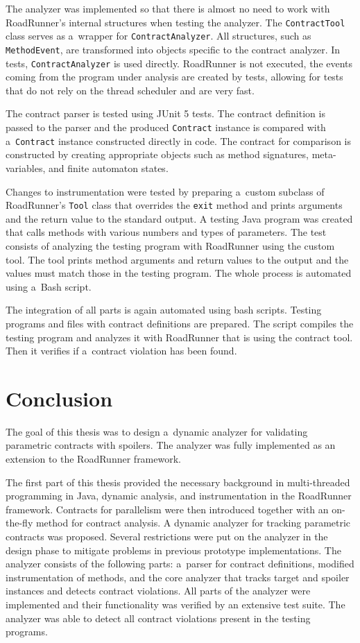 The analyzer was implemented so that there is almost no need to work with
RoadRunner's internal structures when testing the analyzer. The
\texttt{ContractTool} class serves as a~wrapper for \texttt{ContractAnalyzer}.
All structures, such as \texttt{MethodEvent}, are transformed into objects
specific to the contract analyzer. In tests, \texttt{ContractAnalyzer} is used
directly. RoadRunner is not executed, the events coming from the program under
analysis are created by tests, allowing for tests that do not rely on the
thread scheduler and are very fast.

The contract parser is tested using JUnit 5 tests. The contract definition is
passed to the parser and the produced \texttt{Contract} instance is compared
with a~\texttt{Contract} instance constructed directly in code. The contract for
comparison is constructed by creating appropriate objects such as method
signatures, meta-variables, and finite automaton states.

Changes to instrumentation were tested by preparing a~custom subclass of
RoadRunner's \texttt{Tool} class that overrides the \texttt{exit} method and
prints arguments and the return value to the standard output. A testing Java
program was created that calls methods with various numbers and types of
parameters. The test consists of analyzing the testing program with RoadRunner
using the custom tool. The tool prints method arguments and return values to the
output and the values must match those in the testing program. The whole process
is automated using a~Bash script.

The integration of all parts is again automated using bash scripts. Testing
programs and files with contract definitions are prepared. The script compiles
the testing program and analyzes it with RoadRunner that is using the contract
tool. Then it verifies if a~contract violation has been found.



\chapter{Conclusion}

The goal of this thesis was to design a~dynamic analyzer for validating
parametric contracts with spoilers. The analyzer was fully implemented as an
extension to the RoadRunner framework.

The first part of this thesis provided the necessary background in
multi-threaded programming in Java, dynamic analysis, and instrumentation in the
RoadRunner framework. Contracts for parallelism were then introduced together
with an on-the-fly method for contract analysis. A dynamic analyzer for tracking
parametric contracts was proposed. Several restrictions were put on the analyzer
in the design phase to mitigate problems in previous prototype implementations.
The analyzer consists of the following parts: a~parser for contract definitions,
modified instrumentation of methods, and the core analyzer that tracks target
and spoiler instances and detects contract violations. All parts of the analyzer
were implemented and their functionality was verified by an extensive test
suite. The analyzer was able to detect all contract violations present in the
testing programs.

